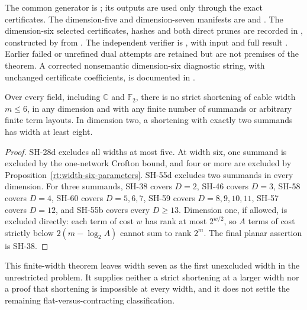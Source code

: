 The common generator is
; its
outputs are used only through the exact certificates.
The dimension-five and dimension-seven manifests are
 and
.
The dimension-six selected certificates, hashes and
both direct prunes are recorded in
, constructed
by  from
.
The independent verifier is
,
with input
and full result
.
Earlier failed or unrefined dual attempts are retained
but are not premises of the theorem.  A corrected
nonsemantic dimension-six diagnostic string, with
unchanged certificate coefficients, is documented in
.

\begin{corollary}
\label{cor:strict-shortening-width-at-least-seven}
Over every field, including $\mathbb C$ and $\mathbb F_2$,
there is no strict shortening of cable width $m\leq6$,
in any dimension and with any finite number of summands
or arbitrary finite term layouts.  In dimension two,
a shortening with exactly two summands has width at
least eight.
\end{corollary}
\begin{proof}
SH-28d excludes all widths at most five.  At width
six, one summand is excluded by the one-network
Crofton bound, and four or more are excluded by
Proposition~\ref{rt:width-six-parameters}.  SH-55d
excludes two summands in every dimension.
For three summands, SH-38 covers $D=2$, SH-46
covers $D=3$, SH-58 covers $D=4$, SH-60 covers
$D=5,6,7$, SH-59 covers $D=8,9,10,11$, SH-57
covers $D=12$, and SH-55b covers every $D\geq13$.
Dimension one, if allowed, is excluded directly:
each term of cost $w$ has rank at most $2^{w/2}$,
so $A$ terms of cost strictly below
$2(m-\log_2 A)$ cannot sum to rank $2^m$.
The final planar assertion is SH-38.
\end{proof}

This finite-width theorem leaves width seven as the
first unexcluded width in the unrestricted problem.
It supplies neither a strict shortening at a larger
width nor a proof that shortening is impossible at
every width, and it does not settle the remaining
flat-versus-contracting classification.
